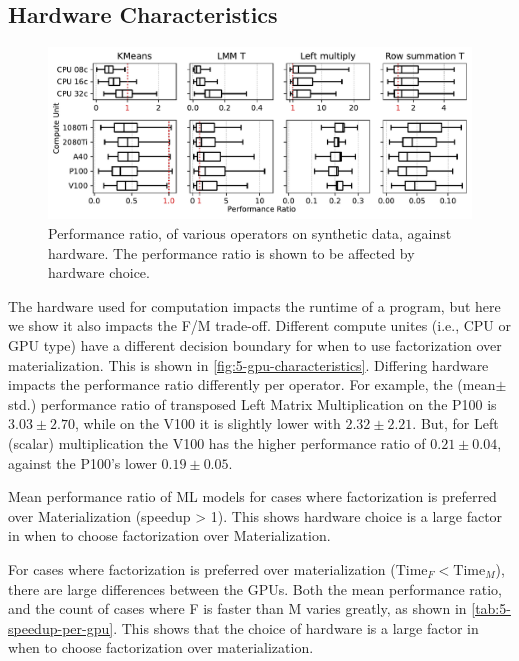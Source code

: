 \subsection{Hardware Characteristics}
\begin{figure}[ht]
    \centering
    \includegraphics[width=\linewidth]{chapters/05_cost_estimation/figures/motivation_speedup_per_operator_per_gpu.pdf}
    \caption[Performance ratio plotted against hardware]{Performance ratio, of various operators on synthetic data, against hardware. The performance ratio is shown to be affected by hardware choice.}
    \label{fig:5-gpu-characteristics}
\end{figure}
The hardware used for computation impacts the runtime of a program, but here we show it also impacts the F/M trade-off. Different compute unites (i.e., CPU or GPU type) have a different decision boundary for when to use factorization over materialization. This is shown in \autoref{fig:5-gpu-characteristics}. Differing hardware impacts the performance ratio differently per operator. For example, the (mean$\pm$std.) performance ratio of transposed Left Matrix Multiplication on the P100 is $3.03\pm2.70$, while on the V100 it is slightly lower with $2.32\pm2.21$. But, for Left (scalar) multiplication the V100 has the higher performance ratio of $0.21\pm0.04$, against the P100's lower $0.19\pm0.05$.

\begin{table}[ht]
    \centering
    
    \caption[Performance ratio of ML models for cases where factorization has positive impact.]{Mean performance ratio of ML models for cases where factorization is preferred over Materialization (speedup > 1). This shows hardware choice is a large factor in when to choose factorization over Materialization.}
    \label{tab:5-speedup-per-gpu}
\end{table}

For cases where factorization is preferred over materialization ($\text{Time}_F < \text{Time}_M$), there are large differences between the GPUs. Both the mean performance ratio, and the count of cases where F is faster than M varies greatly, as shown in \autoref{tab:5-speedup-per-gpu}. This shows that the choice of hardware is a large factor in when to choose factorization over materialization.

